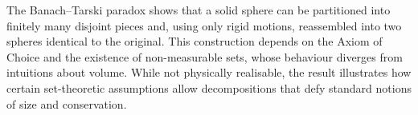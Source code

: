 The Banach–Tarski paradox shows that a solid sphere can be partitioned into finitely many disjoint pieces and, using only rigid motions, reassembled into two spheres identical to the original. This construction depends on the Axiom of Choice and the existence of non-measurable sets, whose behaviour diverges from intuitions about volume. While not physically realisable, the result illustrates how certain set-theoretic assumptions allow decompositions that defy standard notions of size and conservation.